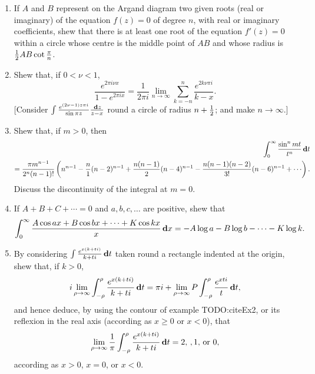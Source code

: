 \begin{enumerate}
\item 
  If $A$ and $B$ represent on the Argand diagram two given roots (real
  or imaginary) of the equation $f(z) = 0$ of degree $n$, with real or
  imaginary coefficients, shew that there is at least one root of the
  equation $f'(z) = 0$ within a circle whose centre is the middle point
  of $AB$ and whose radius is $\frac{1}{2} AB \cot \frac{\pi}{n}$. 
\item
  Shew that, if $0<\nu<1$,
  $$
  \frac{e^{2\pi i \nu x}}{1 - e^{2\pi i x}}
  =
  \frac{1}{2\pi i}
  \lim_{n\rightarrow\infty}
  \sum_{k=-n}^{n} \frac{e^{2k\nu\pi i}}{k-x}.
  $$
  [Consider
  $
  \int \frac{e^{(2\nu-1) z \pi i}}{\sin \pi z}
  \frac{\, \mathbf{d} z}{z-x}
  $
  round a circle of radius $n+\frac{1}{2}$; and make $n\rightarrow\infty$.]
\item
  Shew that, if $m > 0$, then
  \begin{align*}
    \int_{0}^{\infty}
    \frac{\sin^{n} mt}{t^{n}} \dmeasure t
    \\
    =
    \frac{\pi m^{n-1}}{2^{n} (n-1)!}
    \theparen{
      n^{n-1}
      -
      \frac{n}{1} (n-2)^{n-1}
      +
      \frac{n(n-1)}{2} (n-4)^{n-1}
      -
      \frac{n(n-1)(n-2)}{3!} (n-6)^{n-1}
      +
      \cdots
    }.
  \end{align*}
  Discuss the discontinuity of the integral at $m = 0$.

\item
  If $A + B + C + \cdots = 0$ and $a, b, c, \ldots$ are positive, shew that
  $$
  \int_{0}^{\infty}
  \frac{A \cos ax + B \cos bx + \cdots + K \cos kx}{x}
  \, \mathbf{d} x
  =
  -A \log a
  -B \log b
  - \cdots
  -K \log k.
  $$
\item
  By considering
  $
  \int \frac{e^{x(k+ti)}}{k+ti} \, \mathbf{d} t
  $
  taken round a rectangle indented at the origin, shew
  that, if $k > 0$,
  $$
  i \lim_{\rho\rightarrow\infty}
  \int_{-\rho}^{\rho}
  \frac{e^{x(k+ti)}}{k+ti} \, \mathbf{d} t
  =
  \pi i
  +
  \lim_{\rho\rightarrow\infty}
  P \int_{-\rho}^{\rho} \frac{e^{xti}}{t} \, \mathbf{d} t,
  $$
  and hence deduce, by using the contour of
   example 
  TODO:citeEx2, or its reflexion in the real axis
  (according as $x \geq 0$ or $x < 0$), that
  $$
  \lim_{\rho\rightarrow\infty}
  \frac{1}{\pi}
  \int_{-\rho}^{\rho}
  \frac{e^{x(k+ti)}}{k+ti} \, \mathbf{d} t
  =
  2,\, , 1,\, \textrm{or } 0,
  $$
  according as $x>0$, $x = 0$, or $x < 0$.


\end{enumerate}
